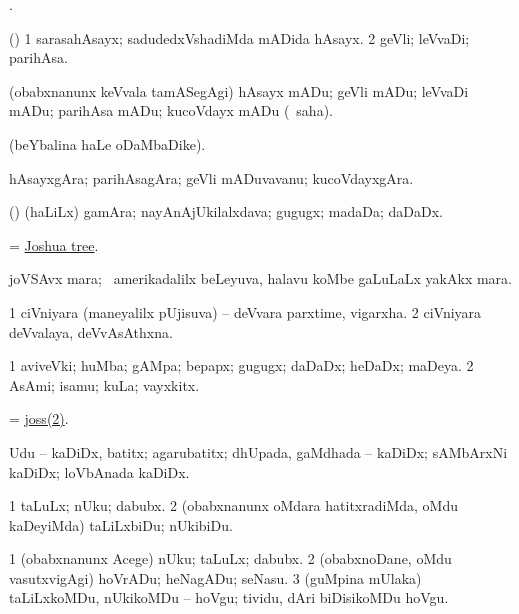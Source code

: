 \bentry
{}
\gl{\saMkiSx}
\bmng
{}. 
\emng
\eentry

\bentry
{}
\gl{\nA}
\bmng
(\ashi) 
\bnum
\num{1} sarasahAsayx; sadudedxVshadiMda mADida hAsayx. 
\num{2} geVli; leVvaDi; parihAsa. 
\enum
\emng
\eentry


\bentry
{}
\gl{\sakirx}
\bmng
(obabxnanunx keVvala tamASegAgi) hAsayx mADu; geVli mADu; leVvaDi mADu; parihAsa mADu; kucoVdayx mADu (\akirx\ saha). 
\emng
\eentry

\bentry
{}
\gl{\saMkiSx}
\bmng
{} (beYbalina haLe oDaMbaDike). 
\emng
\eentry

\bentry
{}
\gl{\nA}
\bmng
hAsayxgAra; parihAsagAra; geVli mADuvavanu; kucoVdayxgAra. 
\emng
\eentry

\bentry
{}
\gl{\nA}
\bmng
(\ashi) (haLiLx) gamAra; nayAnAjUkilalxdava; gugugx; madaDa; daDaDx. 
\emng
\eentry

\bentry
{}
\gl{\nA}
\bmng
 = \hyperlink{Joshua tree}{Joshua tree}. 
\emng
\eentry

\bentry
{}
\gl{\nA}
\bmng
joVSAvx mara; \pa\ amerikadalilx beLeyuva, halavu koMbe gaLuLaLx yakAkx mara. 
\emng
\eentry

\bentry
{}
\gl{\nA}
\bmng
\bnum
\num{1} ciVniyara (maneyalilx pUjisuva) -- deVvara parxtime, vigarxha. 
\hypertarget{joss(2)}{} 
\num{2} ciVniyara deVvalaya, deVvAsAthxna. 
\enum
\emng
\eentry

\bentry
{}
\gl{\nA}
\expl{(\birx) (\ashi)}
\bmng
\bnum
\num{1} aviveVki; huMba; gAMpa; bepapx; gugugx; daDaDx; heDaDx; maDeya. 
\num{2} AsAmi; isamu; kuLa; vayxkitx. 
\enum
\emng
\eentry

\bentry
{}
\gl{\nA}
\bmng
 = \hyperlink{joss(2)}{joss(2)}. 
\emng
\eentry

\bentry
{}
\gl{\nA}
\bmng
Udu -- kaDiDx, batitx; agarubatitx; dhUpada, gaMdhada -- kaDiDx; sAMbArxNi kaDiDx; loVbAnada kaDiDx. 
\emng
\eentry

\bentry
{}
\gl{\sakirx}
\bmng
\bnum
\num{1} taLuLx; nUku; dabubx. 
\num{2} (obabxnanunx oMdara hatitxradiMda, oMdu kaDeyiMda) taLiLxbiDu; nUkibiDu. 
\enum
\emng

\noindent
\gl{\akirx}
\bmng
\bnum
\num{1} (obabxnanunx Acege) nUku; taLuLx; dabubx. 
\num{2} (obabxnoDane, oMdu vasutxvigAgi) hoVrADu; heNagADu; seNasu. 
\num{3} (guMpina mUlaka) taLiLxkoMDu, nUkikoMDu -- hoVgu; tividu, dAri biDisikoMDu hoVgu. 
\enum
\emng
\eentry


